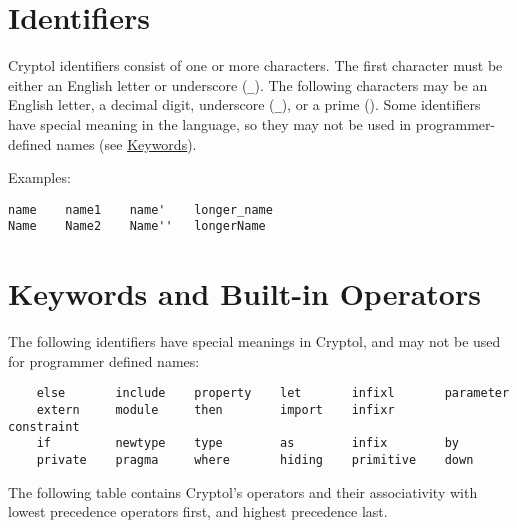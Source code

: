 \hypertarget{identifiers}{%
\section{Identifiers}\label{identifiers}}

Cryptol identifiers consist of one or more characters. The first
character must be either an English letter or underscore (\texttt{\_}).
The following characters may be an English letter, a decimal digit,
underscore (\texttt{\_}), or a prime (\texttt{\textquotesingle{}}). Some
identifiers have special meaning in the language, so they may not be
used in programmer-defined names (see
\protect\hyperlink{keywords-and-built-in-operators}{Keywords}).

Examples:

\begin{verbatim}
name    name1    name'    longer_name
Name    Name2    Name''   longerName
\end{verbatim}

\hypertarget{keywords-and-built-in-operators}{%
\section{Keywords and Built-in
Operators}\label{keywords-and-built-in-operators}}

The following identifiers have special meanings in Cryptol, and may not
be used for programmer defined names:

\begin{verbatim}
    else       include    property    let       infixl       parameter
    extern     module     then        import    infixr       constraint
    if         newtype    type        as        infix        by
    private    pragma     where       hiding    primitive    down
\end{verbatim}

The following table contains Cryptol's operators and their associativity
with lowest precedence operators first, and highest precedence last.

